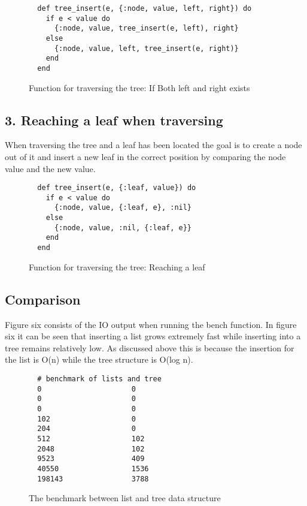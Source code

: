 \documentclass[a4paper,11pt]{article}
\begin{document}
\begin{figure}[H]
\begin{verbatim}
  def tree_insert(e, {:node, value, left, right}) do
    if e < value do
      {:node, value, tree_insert(e, left), right}
    else
      {:node, value, left, tree_insert(e, right)}
    end
  end
\end{verbatim}
\caption{Function for traversing the tree: If Both left and right exists}
\label{Figure:4}
\end{figure}

\subsection*{3. Reaching a leaf when traversing}
When traversing the tree and a leaf has been located the goal is to create a node out of it and insert a new leaf in the correct position by comparing the node value and the new value.

\begin{figure}[H]
\begin{verbatim}
  def tree_insert(e, {:leaf, value}) do
    if e < value do
      {:node, value, {:leaf, e}, :nil}
    else
      {:node, value, :nil, {:leaf, e}}
    end
  end
\end{verbatim}
\caption{Function for traversing the tree: Reaching a leaf}
\label{Figure:5}
\end{figure}

\subsection*{Comparison}
Figure six consists of the IO output when running the bench function. In figure six it can be seen that inserting a list grows extremely fast while inserting into a tree remains relatively low. As discussed above this is because the insertion for the list is O(n) while the tree structure is O(log n).

\begin{figure}[H]
\begin{verbatim}
  # benchmark of lists and tree 
  0                     0
  0                     0
  0                     0
  102                   0
  204                   0
  512                   102
  2048                  102
  9523                  409
  40550                 1536
  198143                3788
\end{verbatim}
\caption{The benchmark between list and tree data structure}
\label{Figure:6}
\end{figure}
\end{document}
